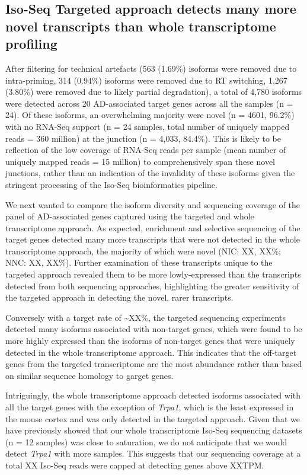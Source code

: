 \clearpage
\subsection{Iso-Seq Targeted approach detects many more novel transcripts than whole transcriptome profiling}
\label{ch6: wholevstargeted}
After filtering for technical artefacts (563 (1.69\%) isoforms were removed due to intra-priming, 314 (0.94\%) isoforms were removed due to RT switching, 1,267 (3.80\%) were removed due to likely partial degradation), a total of 4,780 isoforms were detected across 20 AD-associated target genes across all the samples (n = 24). Of these isoforms, an overwhelming majority were novel (n = 4601, 96.2\%) with no RNA-Seq support (n = 24 samples, total number of uniquely mapped reads = 360 million) at the junction (n = 4,033, 84.4\%). This is likely to be reflection of the low coverage of RNA-Seq reads per sample (mean number of uniquely mapped reads = 15 million) to comprehensively span these novel junctions, rather than an indication of the invalidity of these isoforms given the stringent processing of the Iso-Seq bioinformatics pipeline. 

We next wanted to compare the isoform diversity and sequencing coverage of the panel of AD-associated genes captured using the targeted and whole transcriptome approach. As expected, enrichment and selective sequencing of the target genes detected many more transcripts that were not detected in the whole transcriptome approach, the majority of which were novel (NIC: XX, XX\%; NNC: XX, XX\%). Further examination of these transcripts unique to the targeted approach revealed them to be more lowly-expressed than the transcripts detected from both sequencing approaches, highlighting the greater sensitivity of the targeted approach in detecting the novel, rarer transcripts. 

Conversely with a target rate of \textasciitilde{XX\%}, the targeted sequencing experiments detected many isoforms associated with non-target genes, which were found to be more highly expressed than the isoforms of non-target genes that were uniquely detected in the whole transcriptome approach. This indicates that the off-target genes from the targeted transcriptome are the most abundance rather than based on similar sequence homology to garget genes. 

Intriguingly, the whole transcriptome approach detected isoforms associated with all the target genes with the exception of \textit{Trpa1}, which is the least expressed in the mouse cortex and was only detected in the targeted approach.  Given that we have previously showed that our whole transcriptome Iso-Seq sequencing datasets (n = 12 samples) was close to saturation, we do not anticipate that we would detect \textit{Trpa1} with more samples. This suggests that our sequencing coverage at a total XX Iso-Seq reads were capped at detecting genes above XXTPM.   

